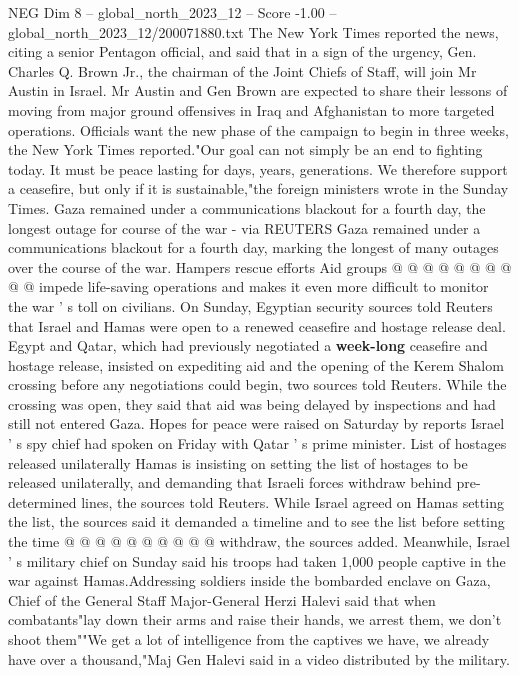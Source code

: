 \begin{textsample}{NEG Dim 8 – global\_north\_2023\_12 – Score -1.00 – global\_north\_2023\_12/200071880.txt}  \label{ex:f8_neg_173}
The New York Times reported the news, citing a senior Pentagon official, and said that in a sign of the urgency, Gen.
Charles Q.
Brown Jr., the chairman of the Joint Chiefs of Staff, will join Mr Austin in Israel.
Mr Austin and Gen Brown are expected to share their lessons of moving from major ground offensives in Iraq and Afghanistan to more targeted operations.
Officials want the new phase of the campaign to begin in three weeks, the New York Times reported."Our goal can not simply be an end to fighting today.
It must be peace lasting for days, years, generations.
We therefore support a ceasefire, but only if it is sustainable,"the foreign ministers wrote in the Sunday Times.
Gaza remained under a communications blackout for a fourth day, the longest outage for course of the war - via REUTERS Gaza remained under a communications blackout for a fourth day, marking the longest of many outages over the course of the war.
Hampers rescue efforts Aid groups @ @ @ @ @ @ @ @ @ @ impede life-saving operations and makes it even more difficult to monitor the war ' s toll on civilians.
On Sunday, Egyptian security sources told Reuters that Israel and Hamas were open to a renewed ceasefire and hostage release deal.
Egypt and Qatar, which had previously negotiated a \textbf{week-long} ceasefire and hostage release, insisted on expediting aid and the opening of the Kerem Shalom crossing before any negotiations could begin, two sources told Reuters.
While the crossing was open, they said that aid was being delayed by inspections and had still not entered Gaza.
Hopes for peace were raised on Saturday by reports Israel ' s spy chief had spoken on Friday with Qatar ' s prime minister.
List of hostages released unilaterally Hamas is insisting on setting the list of hostages to be released unilaterally, and demanding that Israeli forces withdraw behind pre-determined lines, the sources told Reuters.
While Israel agreed on Hamas setting the list, the sources said it demanded a timeline and to see the list before setting the time @ @ @ @ @ @ @ @ @ @ withdraw, the sources added.
Meanwhile, Israel ' s military chief on Sunday said his troops had taken 1,000 people captive in the war against Hamas.Addressing soldiers inside the bombarded enclave on Gaza, Chief of the General Staff Major-General Herzi Halevi said that when combatants"lay down their arms and raise their hands, we arrest them, we don't shoot them""We get a lot of intelligence from the captives we have, we already have over a thousand,"Maj Gen Halevi said in a video distributed by the military.

\end{textsample}
